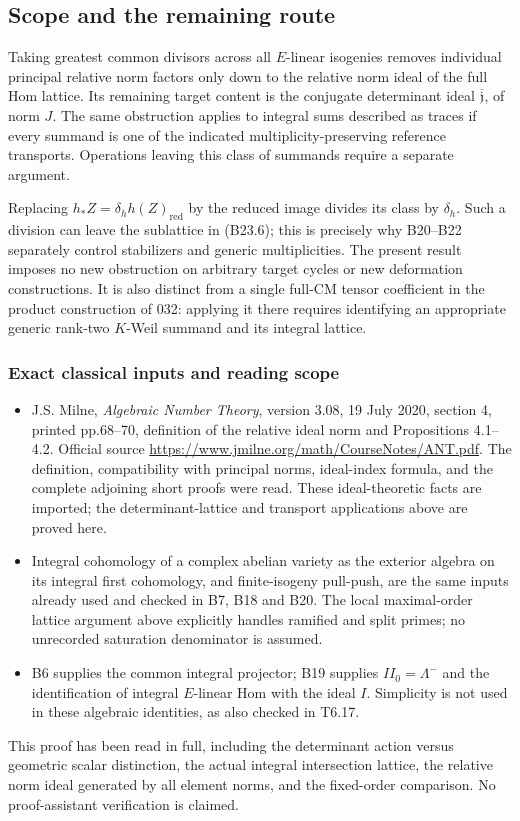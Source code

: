 \subsection{Scope and the remaining route}\label{scope-and-the-remaining-route}

Taking greatest common divisors across all \(E\)-linear isogenies removes individual principal relative norm factors only down to the relative norm ideal of the full Hom lattice. Its remaining target content is the conjugate determinant ideal \(\overline{\mathfrak j}\), of norm \(J\). The same obstruction applies to integral sums described as traces if every summand is one of the indicated multiplicity-preserving reference transports. Operations leaving this class of summands require a separate argument.

Replacing \(h_*Z=\delta_h h(Z)_{\mathrm{red}}\) by the reduced image divides its class by \(\delta_h\). Such a division can leave the sublattice in (B23.6); this is precisely why B20--B22 separately control stabilizers and generic multiplicities. The present result imposes no new obstruction on arbitrary target cycles or new deformation constructions. It is also distinct from a single full-CM tensor coefficient in the product construction of 032: applying it there requires identifying an appropriate generic rank-two \(K\)-Weil summand and its integral lattice.

\subsubsection{Exact classical inputs and reading scope}\label{exact-classical-inputs-and-reading-scope}

\begin{itemize}
\tightlist
\item
  J.S. Milne, \emph{Algebraic Number Theory}, version 3.08, 19 July 2020, section 4, printed pp.68--70, definition of the relative ideal norm and Propositions 4.1--4.2. Official source \url{https://www.jmilne.org/math/CourseNotes/ANT.pdf}. The definition, compatibility with principal norms, ideal-index formula, and the complete adjoining short proofs were read. These ideal-theoretic facts are imported; the determinant-lattice and transport applications above are proved here.
\item
  Integral cohomology of a complex abelian variety as the exterior algebra on its integral first cohomology, and finite-isogeny pull-push, are the same inputs already used and checked in B7, B18 and B20. The local maximal-order lattice argument above explicitly handles ramified and split primes; no unrecorded saturation denominator is assumed.
\item
  B6 supplies the common integral projector; B19 supplies \(II_0=\Lambda^-\) and the identification of integral \(E\)-linear Hom with the ideal \(I\). Simplicity is not used in these algebraic identities, as also checked in T6.17.
\end{itemize}

This proof has been read in full, including the determinant action versus geometric scalar distinction, the actual integral intersection lattice, the relative norm ideal generated by all element norms, and the fixed-order comparison. No proof-assistant verification is claimed.
